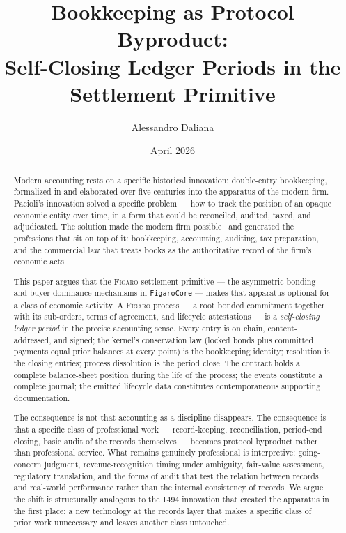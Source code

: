 \documentclass[11pt,a4paper]{article}
\title{%
  Bookkeeping as Protocol Byproduct:\\
  Self-Closing Ledger Periods in the\\
  \figaro{} Settlement Primitive%
}
\author{
  Alessandro Daliana
}
\date{April 2026}
\theoremstyle{definition}
\theoremstyle{remark}
\newcommand{\figaro}{\textsc{Figaro}}
\begin{document}
\maketitle

\begin{abstract}
Modern accounting rests on a specific historical innovation:
double-entry bookkeeping, formalized in
\citet{pacioli1494summa} and elaborated over five centuries
into the apparatus of the modern firm. Pacioli's innovation
solved a specific problem --- how to track the position of an
opaque economic entity over time, in a form that could be
reconciled, audited, taxed, and adjudicated. The solution made
the modern firm possible~\citep{sombart1916moderne,
chandler1977visible} and generated the professions that sit on
top of it: bookkeeping, accounting, auditing, tax preparation,
and the commercial law that treats books as the authoritative
record of the firm's economic acts.

This paper argues that the \figaro{} settlement primitive ---
the asymmetric bonding and buyer-dominance mechanisms in
\texttt{FigaroCore} --- makes that apparatus optional for a
class of economic activity. A \figaro{} process --- a root
bonded commitment together with its sub-orders, terms of
agreement, and lifecycle attestations --- is a \emph{self-closing
ledger period} in the precise accounting sense. Every entry is
on chain, content-addressed, and signed; the kernel's
conservation law (locked bonds plus committed payments equal
prior balances at every point) is the bookkeeping identity;
resolution is the closing entries; process dissolution is the
period close. The contract holds a complete balance-sheet
position during the life of the process; the events constitute
a complete journal; the emitted lifecycle data constitutes
contemporaneous supporting documentation.

The consequence is not that accounting as a discipline
disappears. The consequence is that a specific class of
professional work --- record-keeping, reconciliation,
period-end closing, basic audit of the records themselves ---
becomes protocol byproduct rather than professional service.
What remains genuinely professional is interpretive:
going-concern judgment, revenue-recognition timing under
ambiguity, fair-value assessment, regulatory translation, and
the forms of audit that test the relation between records and
real-world performance rather than the internal consistency of
records. We argue the shift is structurally analogous to the
1494 innovation that created the apparatus in the first place:
a new technology at the records layer that makes a specific
class of prior work unnecessary and leaves another class
untouched.
\end{abstract}
\end{document}
